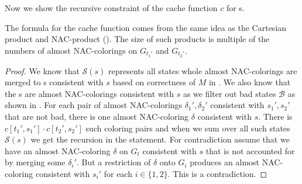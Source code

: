 Now we show the recursive constraint of the cache function \( c \) for \JoinNode{}s.
%
%
The formula for the cache function comes from
the same idea as the Cartesian product and
NAC-product ().
The size of such products is multiple of the numbers of
almost NAC-colorings on \( G_{t_1'} \) and \( G_{t_2'} \).
%
\begin{proof}
	We know that \( \mathcal{S}(s) \) represents all states whole
	almost NAC-colorings are merged to \rbcol{}s consistent with \( s \)
	based on correctness of \( M \) in .
	We also know that the \rbcol{}s are almost NAC-colorings consistent with \( s \)
	as we filter out bad states \( \mathcal{B} \) as shown in .
	For each pair of almost NAC-colorings \( \delta_1', \delta_2' \)
	consistent with \( s_1', s_2' \) that are not bad,
	there is one almost NAC-coloring \( \delta \) consistent with \( s \).
	There is \( c[t_1', s_1'] \cdot c[t_2', s_2'] \) such coloring pairs and
	when we sum over all such states \( \mathcal{S}(s) \)
	we get the recursion in the statement.
	For contradiction assume that we have
	an almost NAC-coloring \( \delta \) on \( G_t \) consistent with \( s \)
	that is not accounted for by merging some \( \delta_i' \).
	But a restriction of \( \delta \) onto \( G_i \) produces an almost NAC-coloring
	consistent with \( s_i' \) for each \( i \in \{1,2\} \). This is a contradiction.
\end{proof}
%


